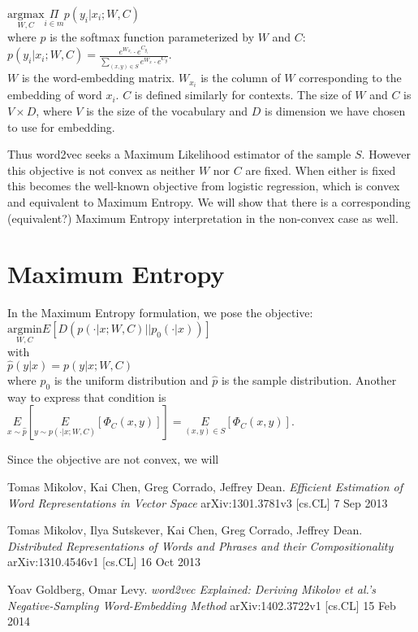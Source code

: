 \documentclass[]{article}
\begin{document}
$\underset{W,C}{\text{argmax}} \underset{i \in m}{\Pi}{p(y_i|x_i; W, C)}$\\

\noindent where $p$ is the softmax function parameterized by $W$ and $C$:\\

$p(y_i|x_i; W,C) = \frac{e^{W_{x_i}} \cdot e^{C_{y_i}}}{\sum_{(x,y) \in S}e^{W_x} \cdot e^{C_y}}$.\\

$W$ is the word-embedding matrix. $W_{x_i}$ is the column of $W$ corresponding to the embedding of word $x_i$. $C$ is defined similarly for contexts. The size of $W$ and $C$ is $V \times D$, where $V$ is the size of the vocabulary and $D$ is dimension we have chosen to use for embedding.

Thus word2vec seeks a Maximum Likelihood estimator of the sample $S$. However this objective is not convex as neither $W$ nor $C$ are fixed. When either is fixed this becomes the well-known objective from logistic regression, which is convex and equivalent to Maximum Entropy\cite{dummy}. We will show that there is a corresponding (equivalent?) Maximum Entropy interpretation in the non-convex case as well.

\section{Maximum Entropy}

In the Maximum Entropy formulation, we pose the objective:\\

$\underset{W,C}{\text{argmin}} E \left[D(p(\cdot|x; W, C) \vert \vert  p_0(\cdot|x))\right]$\\

\noindent with\\

$\hat{p}(y|x) = p(y|x; W,C)$\\

\noindent where $p_0$ is the uniform distribution and $\hat{p}$ is the sample distribution. Another way to express that condition is\\

$\underset{x \sim \hat{p}}{E}\left[\underset{y \sim p(\cdot|x; W,C)}{E}\left[\Phi_C(x,y)\right]\right] = \underset{(x,y) \in S}{E}\left[\Phi_C(x,y)\right]$.

Since the objective are not convex, we will 

\begin{thebibliography}{1}
 Tomas Mikolov, Kai Chen, Greg Corrado, Jeffrey Dean. {\em Efficient Estimation of Word Representations in Vector Space} arXiv:1301.3781v3 [cs.CL] 7 Sep 2013

 Tomas Mikolov, Ilya Sutskever, Kai Chen, Greg Corrado, Jeffrey Dean. {\em Distributed Representations of Words and Phrases and their Compositionality} arXiv:1310.4546v1  [cs.CL]  16 Oct 2013

 Yoav Goldberg, Omar Levy. {\em word2vec Explained: Deriving Mikolov et al.'s Negative-Sampling Word-Embedding Method} arXiv:1402.3722v1  [cs.CL]  15 Feb 2014

\end{thebibliography}
\end{document}
